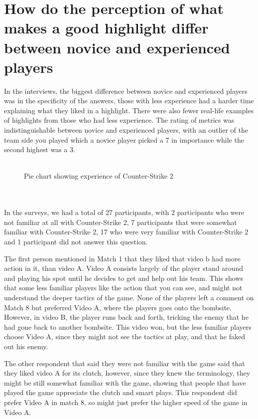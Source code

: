 \section{How do the perception of what makes a good highlight differ between novice and experienced players}
In the interviews, the biggest difference between novice and experienced players was in the specificity of the answers, those with less experience had a harder time explaining what they liked in a highlight. There were also fewer real-life examples of highlights from those who had less experience. The rating of metrics was indistinguishable between novice and experienced players, with an outlier of the team side you played which a novice player picked a 7 in importance while the second highest was a 3.\\\\
\begin{figure}[!h]
\centering
{}
\caption{Pie chart showing experience of Counter-Strike 2}
\label{fig:surveyOverallExperience}
\end{figure}
\\\\
In the surveys, we had a total of 27 participants, with 2 participants who were not familiar at all with Counter-Strike 2, 7 participants that were somewhat familiar with Counter-Strike 2, 17 who were very familiar with Counter-Strike 2 and 1 participant did not answer this question.

The first person mentioned in Match 1 that they liked that video b had more action in it, than video A. Video A consists largely of the player stand around and playing his spot until he decides to get and help out his team. This shows that some less familiar players like the action that you can see, and might not understand the deeper tactics of the game. None of the players left a comment on Match 8 but preferred Video A, where the players goes onto the bombsite. However, in video B, the player runs back and forth, tricking the enemy that he had gone back to another bombsite. This video won, but the less familiar players choose Video A, since they might not see the tactics at play, and that he faked out his enemy.

The other respondent that said they were not familiar with the game said that they liked video A for its clutch, however, since they knew the terminology, they might be still somewhat familiar with the game, showing that people that have played the game appreciate the clutch and smart plays. This respondent did prefer Video A in match 8, so might just prefer the higher speed of the game in Video A.

